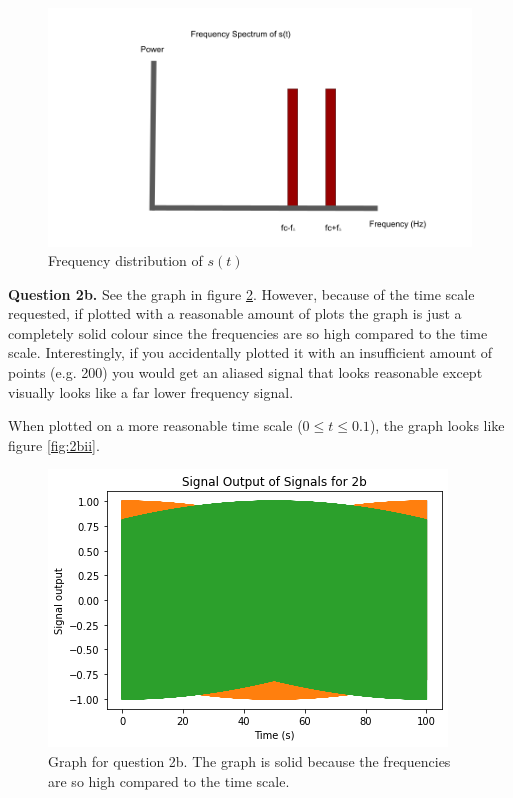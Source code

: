 \documentclass[letterpaper, reqno,11pt]{article}
\begin{document}
\begin{figure}[htbp]
\centering
\includegraphics[width=\textwidth]{images/2a.png}
\caption{Frequency distribution of $s(t)$}
\label{fig:2a}
\end{figure}

{\noindent\bf Question 2b.} See the graph in figure \ref{fig:2bi}. However, because of the time scale requested, if plotted with a reasonable amount of plots the graph is just a completely solid colour since the frequencies are so high compared to the time scale. Interestingly, if you accidentally plotted it with an insufficient amount of points (e.g. 200) you would get an aliased signal that looks reasonable except visually looks like a far lower frequency signal. 

When plotted on a more reasonable time scale ($0\leq t\leq 0.1$), the graph looks like figure \ref{fig:2bii}. 

\begin{figure}[htbp]
\centering
\includegraphics[width=\textwidth]{images/2bi}
\caption{Graph for question 2b. The graph is solid because the frequencies are so high compared to the time scale. }
\label{fig:2bi}
\end{figure}
\end{document}
